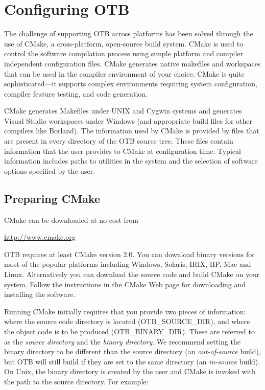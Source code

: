 \section{Configuring OTB}
\label{sec:ConfiguringOTB}

 
The challenge of supporting OTB across platforms has been solved through the
use of CMake, a cross-platform, open-source build system. CMake is used to
control the software compilation process using simple platform and compiler
independent configuration files.  CMake generates native makefiles and
workspaces that can be used in the compiler environment of your choice. CMake
is quite sophisticated---it supports complex environments requiring system
configuration, compiler feature testing, and code generation.

CMake generates Makefiles under UNIX and Cygwin systems and generates Visual
Studio workspaces under Windows (and appropriate build files for other
compilers like Borland). The information used by CMake is provided by
 files that are present in every directory of the OTB
source tree. These files contain information that the user
provides to CMake at configuration time. Typical information includes paths
to utilities in the system and the selection of software options specified by
the user.

\subsection{Preparing CMake}
\label{sec:CMakeforOTB}
 

CMake can be downloaded at no cost from 
\begin{center} 
  \url{http://www.cmake.org}
\end{center}

OTB requires at least CMake version 2.0. You can download binary
versions for most of the popular platforms including Windows, Solaris,
IRIX, HP, Mac and Linux. Alternatively you can download the source
code and build CMake on your system. Follow the instructions in the
CMake Web page for downloading and installing the software.

Running CMake initially requires that you provide two pieces of
information: where the source code directory is located
(OTB\_SOURCE\_DIR), and where the object code is to be produced
(OTB\_BINARY\_DIR). These are referred to as the \emph{source
directory} and the \emph{binary directory}. We recommend setting the
binary directory to be different than the source directory (an
\emph{out-of-source} build), but OTB will still build if they are set
to the same directory (an \emph{in-source} build).  On Unix, the
binary directory is created by the user and CMake is invoked with the
path to the source directory. For example:

